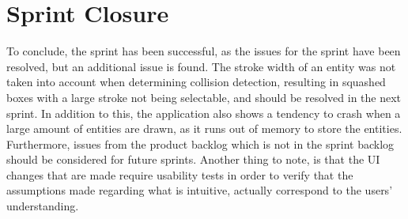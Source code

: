 \section{Sprint Closure}
To conclude, the sprint has been successful, as the issues for the sprint have been resolved, but an additional issue is found. 
The stroke width of an entity was not taken into account when determining collision detection, resulting in squashed boxes with a large stroke not being selectable, and should be resolved in the next sprint. 
In addition to this, the application also shows a tendency to crash when a large amount of entities are drawn, as it runs out of memory to store the entities. 
Furthermore, issues from the product backlog which is not in the sprint backlog should be considered for future sprints.
Another thing to note, is that the UI changes that are made require usability tests in order to verify that the assumptions made regarding what is intuitive, actually correspond to the users' understanding.